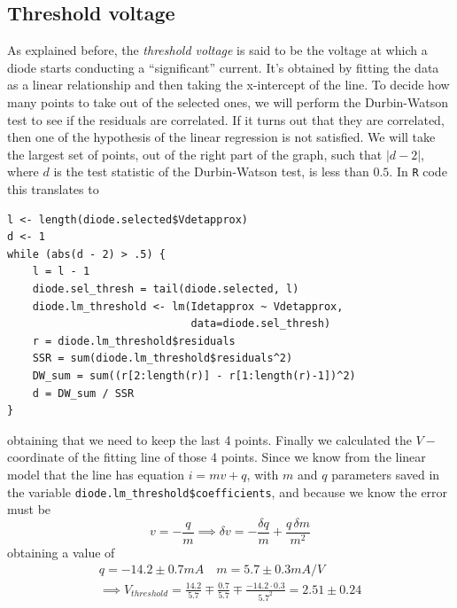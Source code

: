 \subsection{Threshold voltage}
As explained before, the \emph{threshold voltage} is said to be the voltage at
which a diode starts conducting a ``significant'' current. It's obtained by
fitting the data as a linear relationship and then taking the x-intercept of the
line. To decide how many points to take out of the selected ones, we will
perform the Durbin\--Watson test to see if the residuals are correlated. If it
turns out that they are correlated, then one of the hypothesis of the linear
regression is not satisfied. We will take the largest set of points, out of the
right part of the graph, such that \(|d-2|\), where \(d\) is the test statistic of the
Durbin\--Watson test, is less than \(0.5\).
In \texttt{R} code this translates to
\begin{verbatim}
l <- length(diode.selected$Vdetapprox)
d <- 1
while (abs(d - 2) > .5) {
    l = l - 1
    diode.sel_thresh = tail(diode.selected, l)
    diode.lm_threshold <- lm(Idetapprox ~ Vdetapprox,
                             data=diode.sel_thresh)
    r = diode.lm_threshold$residuals
    SSR = sum(diode.lm_threshold$residuals^2)
    DW_sum = sum((r[2:length(r)] - r[1:length(r)-1])^2)
    d = DW_sum / SSR
}
\end{verbatim}
obtaining that we need to keep the last 4 points. Finally we calculated the
\(V-\)coordinate of the fitting line of those 4 points. Since we know from the
linear model that the line has equation \(i = mv + q\), with \(m\) and \(q\)
parameters saved in the variable \texttt{diode.lm\_threshold\$coefficients}, and
because we know the error must be 
\[
    v = -\frac{q}{m} \implies \delta v = -\frac{\delta q}{m} + \frac{q\,\delta m}{m^2}
\]
obtaining a value of 
\begin{align*}
    q = -14.2 \pm 0.7 mA \quad m = 5.7 \pm 0.3 mA / V \\
    \implies V_{threshold} = \frac{14.2}{5.7} \mp \frac{0.7}{5.7} \mp
    \frac{-14.2 \cdot 0.3}{5.7^2} = 2.51 \pm 0.24
\end{align*}


